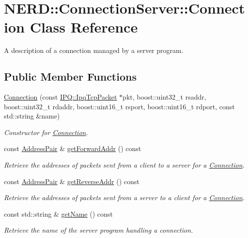 \hypertarget{classNERD_1_1ConnectionServer_1_1Connection}{
\section{\-N\-E\-R\-D\-:\-:\-Connection\-Server\-:\-:\-Connection \-Class \-Reference}
\label{classNERD_1_1ConnectionServer_1_1Connection}
}


\-A description of a connection managed by a server program.  


\subsection*{\-Public \-Member \-Functions}
\begin{DoxyCompactItemize}
\item 
\hyperlink{classNERD_1_1ConnectionServer_1_1Connection_a84d83200cead40def8a0eb1c4480f6e2}{\-Connection} (const \hyperlink{classIPQ_1_1IpqTcpPacket}{\-I\-P\-Q\-::\-Ipq\-Tcp\-Packet} $\ast$pkt, boost\-::uint32\-\_\-t rsaddr, boost\-::uint32\-\_\-t rdaddr, boost\-::uint16\-\_\-t rsport, boost\-::uint16\-\_\-t rdport, const std\-::string \&name)
\begin{DoxyCompactList}\small\item\em \-Constructor for \hyperlink{classNERD_1_1ConnectionServer_1_1Connection}{\-Connection}. \end{DoxyCompactList}\item 
const \hyperlink{structNERD_1_1ConnectionServer_1_1AddressPair}{\-Address\-Pair} \& \hyperlink{classNERD_1_1ConnectionServer_1_1Connection_af076490d2f7f9b23ed91ba3ff6452f9d}{get\-Forward\-Addr} () const 
\begin{DoxyCompactList}\small\item\em \-Retrieve the addresses of packets sent from a client to a server for a \hyperlink{classNERD_1_1ConnectionServer_1_1Connection}{\-Connection}. \end{DoxyCompactList}\item 
const \hyperlink{structNERD_1_1ConnectionServer_1_1AddressPair}{\-Address\-Pair} \& \hyperlink{classNERD_1_1ConnectionServer_1_1Connection_a4998c37ce0f55a17904ded653e5ea95b}{get\-Reverse\-Addr} () const 
\begin{DoxyCompactList}\small\item\em \-Retrieve the addresses of packets sent from a server to a client for a \hyperlink{classNERD_1_1ConnectionServer_1_1Connection}{\-Connection}. \end{DoxyCompactList}\item 
const std\-::string \& \hyperlink{classNERD_1_1ConnectionServer_1_1Connection_a1554fbce9d1ff09e21507fb372fd7077}{get\-Name} () const 
\begin{DoxyCompactList}\small\item\em \-Retrieve the name of the server program handling a connection. \end{DoxyCompactList}\end{DoxyCompactItemize}
